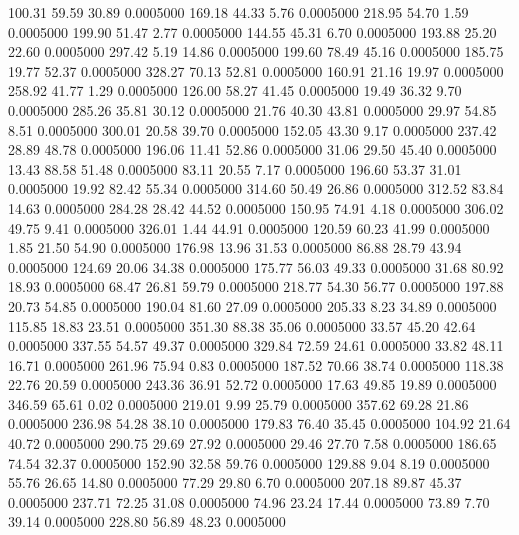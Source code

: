  100.31   59.59   30.89   0.0005000
 169.18   44.33    5.76   0.0005000
 218.95   54.70    1.59   0.0005000
 199.90   51.47    2.77   0.0005000
 144.55   45.31    6.70   0.0005000
 193.88   25.20   22.60   0.0005000
 297.42    5.19   14.86   0.0005000
 199.60   78.49   45.16   0.0005000
 185.75   19.77   52.37   0.0005000
 328.27   70.13   52.81   0.0005000
 160.91   21.16   19.97   0.0005000
 258.92   41.77    1.29   0.0005000
 126.00   58.27   41.45   0.0005000
  19.49   36.32    9.70   0.0005000
 285.26   35.81   30.12   0.0005000
  21.76   40.30   43.81   0.0005000
  29.97   54.85    8.51   0.0005000
 300.01   20.58   39.70   0.0005000
 152.05   43.30    9.17   0.0005000
 237.42   28.89   48.78   0.0005000
 196.06   11.41   52.86   0.0005000
  31.06   29.50   45.40   0.0005000
  13.43   88.58   51.48   0.0005000
  83.11   20.55    7.17   0.0005000
 196.60   53.37   31.01   0.0005000
  19.92   82.42   55.34   0.0005000
 314.60   50.49   26.86   0.0005000
 312.52   83.84   14.63   0.0005000
 284.28   28.42   44.52   0.0005000
 150.95   74.91    4.18   0.0005000
 306.02   49.75    9.41   0.0005000
 326.01    1.44   44.91   0.0005000
 120.59   60.23   41.99   0.0005000
   1.85   21.50   54.90   0.0005000
 176.98   13.96   31.53   0.0005000
  86.88   28.79   43.94   0.0005000
 124.69   20.06   34.38   0.0005000
 175.77   56.03   49.33   0.0005000
  31.68   80.92   18.93   0.0005000
  68.47   26.81   59.79   0.0005000
 218.77   54.30   56.77   0.0005000
 197.88   20.73   54.85   0.0005000
 190.04   81.60   27.09   0.0005000
 205.33    8.23   34.89   0.0005000
 115.85   18.83   23.51   0.0005000
 351.30   88.38   35.06   0.0005000
  33.57   45.20   42.64   0.0005000
 337.55   54.57   49.37   0.0005000
 329.84   72.59   24.61   0.0005000
  33.82   48.11   16.71   0.0005000
 261.96   75.94    0.83   0.0005000
 187.52   70.66   38.74   0.0005000
 118.38   22.76   20.59   0.0005000
 243.36   36.91   52.72   0.0005000
  17.63   49.85   19.89   0.0005000
 346.59   65.61    0.02   0.0005000
 219.01    9.99   25.79   0.0005000
 357.62   69.28   21.86   0.0005000
 236.98   54.28   38.10   0.0005000
 179.83   76.40   35.45   0.0005000
 104.92   21.64   40.72   0.0005000
 290.75   29.69   27.92   0.0005000
  29.46   27.70    7.58   0.0005000
 186.65   74.54   32.37   0.0005000
 152.90   32.58   59.76   0.0005000
 129.88    9.04    8.19   0.0005000
  55.76   26.65   14.80   0.0005000
  77.29   29.80    6.70   0.0005000
 207.18   89.87   45.37   0.0005000
 237.71   72.25   31.08   0.0005000
  74.96   23.24   17.44   0.0005000
  73.89    7.70   39.14   0.0005000
 228.80   56.89   48.23   0.0005000
